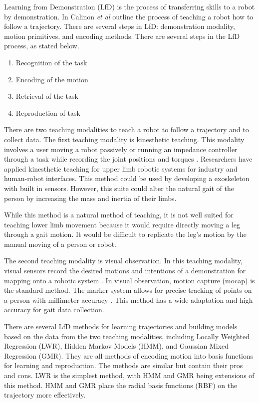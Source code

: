 Learning from Demonstration (LfD) is the process of transferring skills to a robot by demonstration. In \cite{siciliano2016springer}  \cite{kormushev2011imitation} \cite{calinon2007teacher} Calinon \textit{et al} outline the process of teaching a robot how to follow a trajectory. There are several steps in LfD: demonstration modality, motion primitives, and encoding methods. There are several steps in the LfD process, as stated below. 

\begin{enumerate}
    \item Recognition of the task 
    \item Encoding of the motion 
    \item Retrieval of the task 
    \item Reproduction of task 
\end{enumerate} 

There are two teaching modalities to teach a robot to follow a trajectory and to collect data. The first teaching modality is kinesthetic teaching. This modality involves a user moving a robot passively or running an impedance controller through a task while recording the joint positions and torques \cite{Calinon2018}. Researchers have applied kinesthetic teaching for upper limb robotic systems for industry and human-robot interfaces. This method could be used by developing a exoskeleton with built in sensors. However, this suite could alter the natural gait of the person by increasing the mass and inertia of their limbs. 


While this method is a natural method of teaching, it is not well suited for teaching lower limb movement because it would require directly moving a leg through a gait motion. It would be difficult to replicate the leg's motion by the manual moving of a person or robot. 

The second teaching modality is visual observation. In this teaching modality, visual sensors record the desired motions and intentions of a demonstration for mapping onto a robotic system \cite{CalinonLee19}. In visual observation, motion capture (mocap) is the standard method. The marker system allows for precise tracking of points on a person with millimeter accuracy \cite{ott2008motion}. This method has a wide adaptation and high accuracy for gait data collection\cite{ViconGaiting}.

There are several LfD methods for learning trajectories and building models based on the data from the two teaching modalities, including Locally Weighted Regression (LWR), Hidden Markov Models (HMM), and Gaussian Mixed Regression (GMR). They are all methods of encoding motion into basis functions for learning and reproduction. The methods are similar but contain their pros and cons. LWR is the simplest method, with HMM and GMR being extensions of this method. HMM and GMR place the radial basis functions (RBF) on the trajectory more effectively.  

